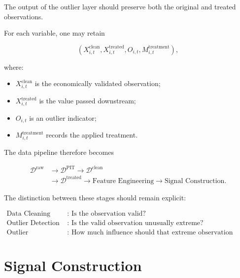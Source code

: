 \documentclass[11pt,a4paper]{article}
\begin{document}
The output of the outlier layer should preserve both the original and treated
observations.

For each variable, one may retain

\begin{equation}
\boxed{
\left(
X_{i,t}^{\mathrm{clean}},
X_{i,t}^{\mathrm{treated}},
O_{i,t},
M_{i,t}^{\mathrm{treatment}}
\right),
}
\end{equation}

where:

\begin{itemize}
    \item $X_{i,t}^{\mathrm{clean}}$ is the economically validated observation;
    \item $X_{i,t}^{\mathrm{treated}}$ is the value passed downstream;
    \item $O_{i,t}$ is an outlier indicator;
    \item $M_{i,t}^{\mathrm{treatment}}$ records the applied treatment.
\end{itemize}

The data pipeline therefore becomes

\begin{equation}
\boxed{
\begin{aligned}
\mathcal{D}^{\mathrm{raw}}
&\rightarrow
\mathcal{D}^{\mathrm{PIT}}
\rightarrow
\mathcal{D}^{\mathrm{clean}}
\\[0.1cm]
&\rightarrow
\mathcal{D}^{\mathrm{treated}}
\rightarrow
\text{Feature Engineering}
\rightarrow
\text{Signal Construction}.
\end{aligned}
}
\end{equation}

The distinction between these stages should remain explicit:

\begin{equation}
\boxed{
\begin{aligned}
\text{Data Cleaning}
&:
\text{ Is the observation valid?}
\\
\text{Outlier Detection}
&:
\text{ Is the valid observation unusually extreme?}
\\
\text{Outlier Treatment}
&:
\text{ How much influence should that extreme observation retain?}
\end{aligned}
}
\end{equation}


\part{Signal Construction}
\end{document}
